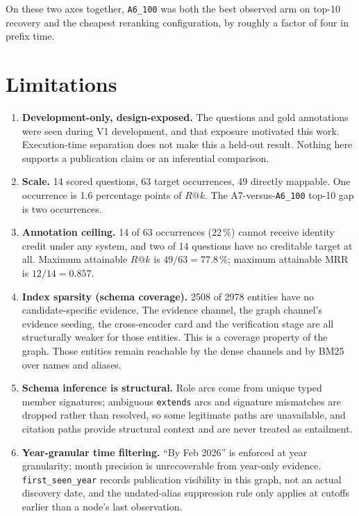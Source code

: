 \documentclass[11pt,a4paper]{article}
\begin{document}
On these two axes together, \texttt{A6\_100} was both the best observed arm on top-10 recovery and the
cheapest reranking configuration, by roughly a factor of four in prefix time.

\section{Limitations}

\begin{enumerate}
\item \textbf{Development-only, design-exposed.} The questions and gold annotations were seen during V1
development, and that exposure motivated this work. Execution-time separation does not make this a held-out
result. Nothing here supports a publication claim or an inferential comparison.

\item \textbf{Scale.} 14 scored questions, 63 target occurrences, 49 directly mappable. One occurrence is
1.6 percentage points of $R@k$. The A7-versus-\texttt{A6\_100} top-10 gap is two occurrences.

\item \textbf{Annotation ceiling.} 14 of 63 occurrences (22\,\%) cannot receive identity credit under any
system, and two of 14 questions have no creditable target at all. Maximum attainable $R@k$ is
$49/63 = 77.8\,\%$; maximum attainable MRR is $12/14 = 0.857$.

\item \textbf{Index sparsity (schema coverage).} 2508 of 2978 entities have no candidate-specific evidence.
The evidence channel, the graph channel's evidence seeding, the cross-encoder card and the verification stage
are all structurally weaker for those entities. This is a coverage property of the graph. Those entities
remain reachable by the dense channels and by BM25 over names and aliases.

\item \textbf{Schema inference is structural.} Role arcs come from unique typed member signatures; ambiguous
\texttt{extends} arcs and signature mismatches are dropped rather than resolved, so some legitimate paths are
unavailable, and citation paths provide structural context and are never treated as entailment.

\item \textbf{Year-granular time filtering.} ``By Feb 2026'' is enforced at year granularity; month precision
is unrecoverable from year-only evidence. \texttt{first\_seen\_year} records publication visibility in this
graph, not an actual discovery date, and the undated-alias suppression rule only applies at cutoffs earlier
than a node's last observation.


\end{enumerate}
\end{document}
